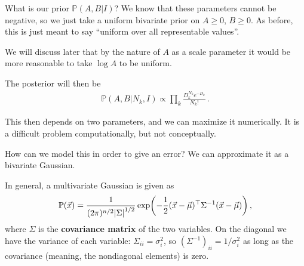 \documentclass[main.tex]{subfiles}
\begin{document}
What is our prior \(\mathbb{P}(A,B | I)\)? We know that these parameters cannot be negative, so we just take a uniform bivariate prior on \(A\geq 0\),  \(B \geq 0\).
As before, this is just meant to say ``uniform over all representable values''. 

We will discuss later that by the nature of \(A\) as a scale parameter it would be more reasonable to take \(\log A\) to be uniform.

The posterior will then be 
%
\begin{align}
\mathbb{P}(A, B | N_k, I) \propto
 \prod_k \frac{D_k^{N_k} e^{-D_k}}{N_k!}
\,.
\end{align}

This then depends on two parameters, and we can maximize it numerically. It is a difficult problem computationally, but not conceptually. 

How can we model this in order to give an error? We can approximate it as a bivariate Gaussian. 

In general, a multivariate Gaussian is given as 
%
\begin{align}
\mathbb{P}(\vec{x}) = \frac{1}{(2 \pi )^{n/2} \abs{\Sigma }^{1/2}}
\exp(- \frac{1}{2} (\vec{x} - \vec{\mu})^{\top} \Sigma^{-1} (\vec{x} - \vec{\mu}))
\,,
\end{align}
%
where \(\Sigma \) is the \textbf{covariance matrix} of the two variables. 
On the diagonal we have the variance of each variable: \(\Sigma_{ii} = \sigma_i^2\), so \((\Sigma^{-1})_{ii} = 1 / \sigma _i^2\) as long as the covariance (meaning, the nondiagonal elements) is zero.
\end{document}
